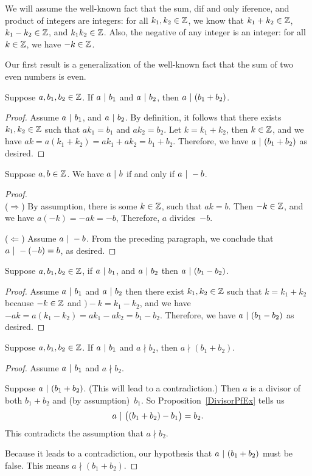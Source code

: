 \documentclass[../MATH-2000-Notes.tex]{subfiles}
\begin{document}
We will assume the well-known fact that the sum, dif and only iference, and product of integers are integers: for all $k_1, k_2 \in \mathbb{Z}$, we know that $k_1 + k_2 \in \mathbb{Z}$, $k_1 - k_2 \in \mathbb{Z}$, and $k_1 k_2 \in \mathbb{Z}$. Also, the negative of any integer is an integer: for all $k \in \mathbb{Z}$, we have $-k \in \mathbb{Z}$.

Our first result is a generalization of the well-known fact that the sum of two even numbers is even.
\begin{Proposition}
    {}
    Suppose $a,b_1,b_2 \in \mathbb{Z}$.
    If $a \ |\  b_1$ and $a \ |\  b_2$, then $a \ |\  (b_1 + b_2)$.
\end{Proposition}
\begin{proof}
    Assume \(a \ |\  b_1\), and \(a \ |\  b_2\). By definition, it follows that there exists \(k_1,k_2 \in \mathbb{Z}\) such that \(ak_1 = b_1\) and \(ak_2 = b_2\). Let \(k = k_1 + k_2\), then \(k\in \mathbb{Z}\), and we have \(ak = a(k_1 + k_2) = ak_1 + ak_2 = b_1 + b_2\). Therefore, we have \(a \ |\  (b_1 + b_2)\) as desired.
\end{proof}
\begin{Proposition}
    {}
    Suppose $a,b \in \mathbb{Z}$.
    We have $a \ |\  b$ if and only if $a \ |\  -b$.
\end{Proposition}
\begin{proof}~\\
    ($\Rightarrow$) By assumption, there is some $k \in \mathbb{Z}$, such that $a k = b$. Then $-k \in \mathbb{Z}$, and we have $a(-k) = -ak = -b$, Therefore, $a$ divides~$-b$.

    ($\Leftarrow$) Assume $a \ |\  -b$. From the preceding paragraph, we conclude that $a \ |\  -(-b) = b$, as desired.
\end{proof}
\begin{Proposition}
    {}
    Suppose \(a,b_1,b_2 \in \mathbb{Z}\), if \(a \ |\  b_1\), and \(a \ |\  b_2\) then \(a \ |\  (b_1 -b_2)\).
\end{Proposition}
\begin{proof}
    Assume \(a \ |\  b_1\) and \(a \ |\  b_2\) then there exist \(k_1,k_2 \in \mathbb{Z}\) such that \(k = k_1 + k_2\) because \(-k \in \mathbb{Z}\) and \() -k = k_1 - k_2\), and we have \(-ak = a(k_1-k_2) = ak_1 - ak_2 = b_1 - b_2\). Therefore, we have \(a\ |\  (b_1 - b_2)\) as desired.
\end{proof}
\begin{Proposition}
    {}
    \label{DivisorPfEx}
    Suppose $a,b_1,b_2 \in \mathbb{Z}$.
    If $a \ |\  b_1$ and $a \nmid b_2$, then $a \nmid (b_1 + b_2)$.
\end{Proposition}
\begin{proof}
    Assume $a \ |\  b_1$ and $a \nmid b_2$.

    Suppose $a \ |\  (b_1 + b_2)$. (This will lead to a contradiction.) Then $a$ is a divisor of both $b_1 + b_2$ and (by assumption)~$b_1$. So Proposition~\ref{DivisorPfEx} tells us
    $$a \ |\  \bigl( (b_1 + b_2) - b_1 \bigr) = b_2 .$$
    This contradicts the assumption that $a \nmid b_2$.

    Because it leads to a contradiction, our hypothesis that $a \ |\  (b_1 + b_2)$ must be false. This means $a \nmid (b_1 + b_2)$.
\end{proof}
\end{document}
